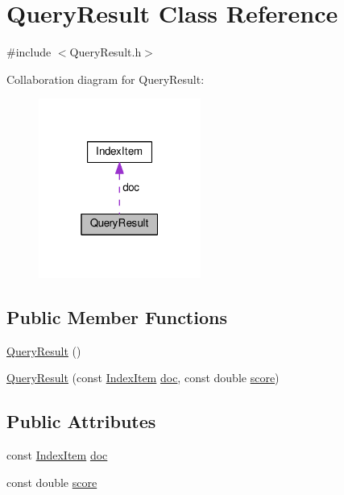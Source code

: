 \hypertarget{classQueryResult}{}\section{Query\+Result Class Reference}
\label{classQueryResult}


{\ttfamily \#include $<$Query\+Result.\+h$>$}



Collaboration diagram for Query\+Result\+:\nopagebreak
\begin{figure}[H]
\begin{center}
\leavevmode
\includegraphics[width=151pt]{classQueryResult__coll__graph}
\end{center}
\end{figure}
\subsection*{Public Member Functions}
\begin{DoxyCompactItemize}
\item 
\hyperlink{classQueryResult_a23c0f8433d60025e81759f569dc08ab8}{Query\+Result} ()
\item 
\hyperlink{classQueryResult_ae765defee1fe2d3a1361f00d24de6f8b}{Query\+Result} (const \hyperlink{classIndexItem}{Index\+Item} \hyperlink{classQueryResult_ab078a6cc489f8f8f05d7ea97d8514b82}{doc}, const double \hyperlink{classQueryResult_ab76d940559daeac2b7eace3851c9a162}{score})
\end{DoxyCompactItemize}
\subsection*{Public Attributes}
\begin{DoxyCompactItemize}
\item 
const \hyperlink{classIndexItem}{Index\+Item} \hyperlink{classQueryResult_ab078a6cc489f8f8f05d7ea97d8514b82}{doc}
\item 
const double \hyperlink{classQueryResult_ab76d940559daeac2b7eace3851c9a162}{score}
\end{DoxyCompactItemize}
